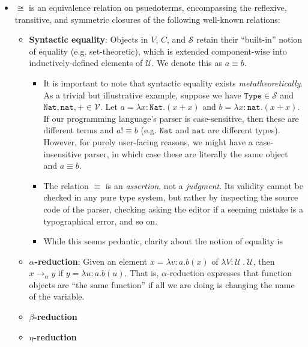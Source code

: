 \begin{definition}
\begin{itemize}
            \item $\cong$ is an equivalence relation on psuedoterms, encompassing the reflexive, transitive, and symmetric closures of the following well-known relations:
            \begin{itemize}
                \item \textbf{Syntactic equality}: Objects in $V$, $C$, and $\mathcal{S}$ retain their ``built-in'' notion of equality (e.g. set-theoretic), which is extended component-wise into inductively-defined elements of $\mathcal{U}$. We denote this as $a \equiv b$.
                \begin{itemize}
                    \item It is important to note that syntactic equality exists \emph{metatheoretically}. As a trivial but illustrative example, suppose we have $\texttt{Type} \in \mathcal{S}$ and $\texttt{Nat},\texttt{nat},+ \in \mathcal{V}$. Let $a = \lambda x:\texttt{Nat} . (x + x)$ and $b = \lambda x: \texttt{nat} . (x + x)$. If our programming language's parser is case-sensitive, then these are different terms and $a !\equiv b$ (e.g. $\texttt{Nat}$ and $\texttt{nat}$ are different types). However, for purely user-facing reasons, we might have a case-insensitive parser, in which case these are literally the same object and $a \equiv b$.
                    \item The relation $\equiv$ is an \emph{assertion}, not a \emph{judgment}. Its validity cannot be checked in any pure type system, but rather by inspecting the source code of the parser, checking  asking the editor if a seeming mistake is a typographical error, and so on.
                    \item While this seems pedantic, clarity about the notion of equality is %
                \end{itemize} 
                \item \textbf{$\alpha$-reduction}: Given an element $x = \lambda v : a . b(x)$ of $\lambda V : \mathcal{U}\ .\ \mathcal{U}$, then $x \rightarrow_{\alpha} y$ if $y = \lambda u : a . b(u)$. That is, $\alpha$-reduction expresses that function objects are ``the same function'' if all we are doing is changing the name of the variable.
                \item \textbf{$\beta$-reduction}
                \item \textbf{$\eta$-reduction}
            \end{itemize}
    \end{itemize}
\end{definition}

